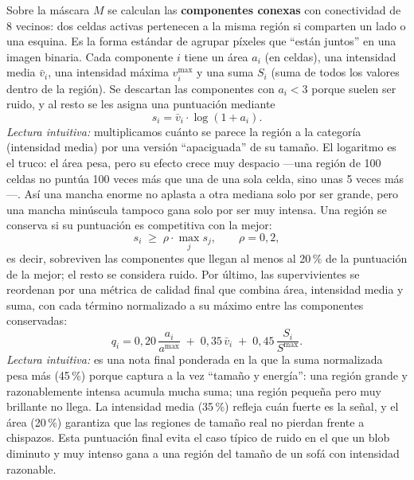 \documentclass[11pt,fleqn,openany]{book} %
\begin{document}
Sobre la máscara $M$ se calculan las \textbf{componentes conexas} con conectividad de 8 vecinos: dos celdas activas pertenecen a la misma región si comparten un lado o una esquina. Es la forma estándar de agrupar píxeles que ``están juntos'' en una imagen binaria. Cada componente $i$ tiene un área $a_i$ (en celdas), una intensidad media $\bar v_i$, una intensidad máxima $v^{\max}_i$ y una suma $S_i$ (suma de todos los valores dentro de la región). Se descartan las componentes con $a_i < 3$ porque suelen ser ruido, y al resto se les asigna una puntuación mediante
%
\begin{equation}
s_i = \bar v_i \cdot \log(1 + a_i).
\label{eq:component_score}
\end{equation}
%
\emph{Lectura intuitiva:} multiplicamos cuánto se parece la región a la categoría (intensidad media) por una versión ``apaciguada'' de su tamaño. El logaritmo es el truco: el área pesa, pero su efecto crece muy despacio ---una región de 100 celdas no puntúa 100 veces más que una de una sola celda, sino unas 5 veces más---. Así una mancha enorme no aplasta a otra mediana solo por ser grande, pero una mancha minúscula tampoco gana solo por ser muy intensa. Una región se conserva si su puntuación es competitiva con la mejor:
%
\begin{equation}
s_i \;\geq\; \rho \cdot \max_{j} s_j,\qquad \rho = 0{,}2,
\label{eq:keep_ratio}
\end{equation}
%
es decir, sobreviven las componentes que llegan al menos al 20\,\% de la puntuación de la mejor; el resto se considera ruido. Por último, las supervivientes se reordenan por una métrica de calidad final que combina área, intensidad media y suma, con cada término normalizado a su máximo entre las componentes conservadas:
%
\begin{equation}
q_i = 0{,}20\,\frac{a_i}{a^{\max}} \;+\; 0{,}35\,\bar v_i \;+\; 0{,}45\,\frac{S_i}{S^{\max}}.
\label{eq:quality}
\end{equation}
%
\emph{Lectura intuitiva:} es una nota final ponderada en la que la suma normalizada pesa más (45\,\%) porque captura a la vez ``tamaño y energía'': una región grande y razonablemente intensa acumula mucha suma; una región pequeña pero muy brillante no llega. La intensidad media (35\,\%) refleja cuán fuerte es la señal, y el área (20\,\%) garantiza que las regiones de tamaño real no pierdan frente a chispazos. Esta puntuación final evita el caso típico de ruido en el que un blob diminuto y muy intenso gana a una región del tamaño de un sofá con intensidad razonable.
\end{document}
